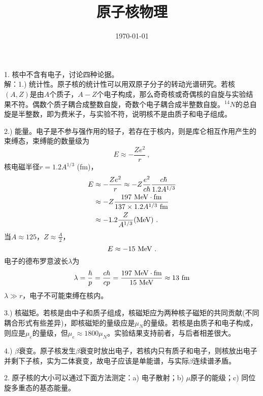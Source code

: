 \documentclass[11pt,a4paper]{article}
\title{原子核物理}
\author{}
\date{\today}
\begin{document}
\maketitle

1. 核中不含有电子，讨论四种论据。\\
解：1.) 统计性。原子核的统计性可以用双原子分子的转动光谱研究。若核$(A, Z)$是由$A$个质子，$A-Z$个电子构成，那么奇奇核或奇偶核的自旋与实验结果不符。偶数个质子耦合成整数自旋，奇数个电子耦合成半整数自旋。${}^{14}N$的总自旋是半整数，即为费米子，与实验不符，说明核不是由质子和电子组成。

2.) 能量。电子是不参与强作用的轻子，若存在于核内，则是库仑相互作用产生的束缚态，束缚能的数量级为
\begin{equation*}
E \approx -\frac{Ze^2}{r} ~,
\end{equation*}
核电磁半径$r = 1.2 A^{1/3}$ (fm)，
\begin{align*}
E &\approx -\frac{Ze^2}{r}  \approx -Z \frac{e^2}{c\hbar} \frac{c\hbar}{1.2 A^{1/3} } \\
&\approx -Z \frac{197 ~{\rm MeV\cdot fm}}{137 \times 1.2 A^{1/3} ~{\rm fm}} \\
&\approx -1.2 \frac{Z}{A^{1/3} } ({\rm MeV}) ~.
\end{align*}
当$A \approx 125$，$Z \approx \frac{A}{2}$，
\begin{equation}
E \approx -15 ~{\rm MeV} ~.
\end{equation}
电子的德布罗意波长$\lambda$为
\begin{equation}
\lambda = \frac{\hbar}{p} = \frac{c\hbar}{cp} = \frac{197 ~{\rm MeV\cdot fm}}{15 ~{\rm MeV} } \approx 13 ~{\rm fm}
\end{equation}
$\lambda \gg r$，电子不可能束缚在核内。

3.) 核磁矩。若核是由中子和质子组成，核磁矩应为两种核子磁矩的共同贡献(不同耦合形式有些差异)，即核磁矩的量级应是$\mu_N$的量级。若核是由质子和电子构成，则应是$\mu_e$的量级，但$\mu_e \approx 1800 \mu_N$。实验结果支持前者，与后者相差很大。

4.) $\beta$衰变。原子核发生$\beta$衰变时放出电子，若核内只有质子和电子，则核放出电子并剩下子核，实为二体衰变，故电子应该是单能谱，与实际$\beta$连续谱矛盾。


2. 原子核的大小可以通过下面方法测定：a) 电子散射；b) $\mu$原子的能级；c) 同位旋多重态的基态能量。
\end{document}
